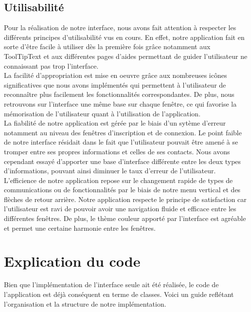 \documentclass[11pt]{article}
\begin{document}
\subsection{Utilisabilité}
Pour la réalisation de notre interface, nous avons fait attention à respecter les différents principes d'utilisabilité vus en cours. En effet, notre application fait en sorte d'être facile à utiliser dès la première fois grâce notamment aux ToolTipText et aux différentes pages d'aides permettant de guider l'utilisateur ne connaissant pas trop l'interface.~\\
La facilité d'appropriation est mise en oeuvre grâce aux nombreuses icônes significatives que nous avons implémentés qui permettent à l'utilisateur de reconnaître plus facilement les fonctionnalités correspondantes. De plus, nous retrouvons sur l'interface une même base sur chaque fenêtre, ce qui favorise la mémorisation de l'utilisateur quant à l'utilisation de l'application. ~\\
La fiabilité de notre application est gérée par le biais d'un sytème d'erreur notamment au niveau des fenêtres d'inscription et de connexion. Le point faible de notre interface résidait dans le fait que l'utilisateur pouvait être amené à se tromper entre ses propres informations et celles de ses contacts. Nous avons cependant essayé d'apporter une base d'interface différente entre les deux types d'informations, pouvant ainsi diminuer le taux d'erreur de l'utilisateur.~\\
L'efficience de notre application repose sur le changement rapide de types de communications ou de fonctionnalités par le biais de notre menu vertical et des flèches de retour arrière. 
Notre application respecte le principe de satisfaction car l'utilisateur est ravi de pouvoir avoir une navigation fluide et efficace entre les différentes fenêtres. De plus, le thème couleur apporté par l'interface est agréable et permet une certaine harmonie entre les fenêtres.

\section{Explication du code}
Bien que l'implémentation de l'interface seule ait été réalisée, le code de l'application est déjà conséquent en terme de classes. Voici un guide reflétant l'organisation et la structure de notre implémentation.
\end{document}
